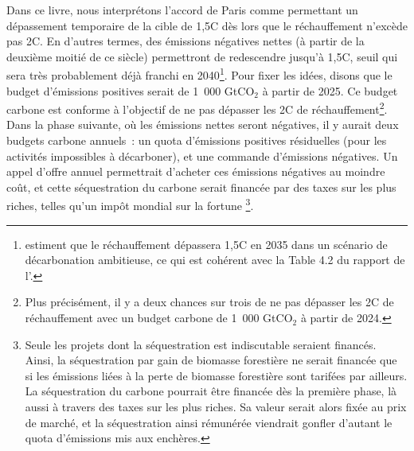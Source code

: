 \documentclass[a5paper,french,openany]{memoir}
\begin{document}
Dans ce livre, nous interprétons l'accord de Paris comme permettant un dépassement temporaire de la cible de 1,5\textdegree{}C dès lors que le réchauffement n'excède pas 2\textdegree{}C. En d'autres termes, des émissions négatives nettes (à partir de la deuxième moitié de ce siècle) permettront de redescendre jusqu'à 1,5\textdegree{}C, seuil qui sera très probablement déjà franchi en 2040\footnote{\citet{diffenbaugh_data-driven_2023} estiment que le réchauffement dépassera 1,5\textdegree{}C en 2035 dans un scénario de décarbonation ambitieuse, ce qui est cohérent avec la Table 4.2 du rapport de l'\citet{ipcc_climate_2021}.}. 
Pour fixer les idées, disons que le budget d'émissions positives serait de 1~000 GtCO$_\text{2}$ à partir de 2025. Ce budget carbone est conforme à l'objectif de ne pas dépasser les 2\textdegree{}C de réchauffement\footnote{Plus précisément, il y a deux chances sur trois de ne pas dépasser les 2\textdegree{}C de réchauffement avec un budget carbone de 1~000 GtCO$_\text{2}$ à partir de 2024.}. 
Dans la phase suivante, où les émissions nettes seront négatives, il y aurait deux budgets carbone annuels~: un quota d'émissions positives résiduelles (pour les activités impossibles à décarboner), et une commande d'émissions négatives. Un appel d'offre annuel permettrait d'acheter ces émissions négatives au moindre coût, et cette séquestration du carbone serait financée par des taxes sur les plus riches, telles qu'un impôt mondial sur la fortune
\footnote{Seule les projets dont la séquestration est indiscutable seraient financés. Ainsi, la séquestration par gain de biomasse forestière ne serait financée que si les émissions liées à la perte de biomasse forestière sont tarifées par ailleurs. La séquestration du carbone pourrait être financée dès la première phase, là aussi à travers des taxes sur les plus riches. Sa valeur serait alors fixée au prix de marché, et la séquestration ainsi rémunérée viendrait gonfler d'autant le quota d'émissions mis aux enchères.}. %
\end{document}
